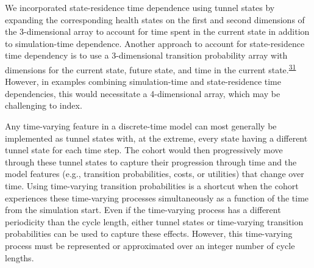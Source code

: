 \documentclass[
]{article}
\begin{document}
We incorporated state-residence time dependence using tunnel states by expanding the corresponding health states on the first and second dimensions of the 3-dimensional array to account for time spent in the current state in addition to simulation-time dependence. Another approach to account for state-residence time dependency is to use a 3-dimensional transition probability array with dimensions for the current state, future state, and time in the current state.\textsuperscript{\protect\hyperlink{ref-Hawkins2005}{31}} However, in examples combining simulation-time and state-residence time dependencies, this would necessitate a 4-dimensional array, which may be challenging to index.

Any time-varying feature in a discrete-time model can most generally be implemented as tunnel states with, at the extreme, every state having a different tunnel state for each time step. The cohort would then progressively move through these tunnel states to capture their progression through time and the model features (e.g., transition probabilities, costs, or utilities) that change over time. Using time-varying transition probabilities is a shortcut when the cohort experiences these time-varying processes simultaneously as a function of the time from the simulation start. Even if the time-varying process has a different periodicity than the cycle length, either tunnel states or time-varying transition probabilities can be used to capture these effects. However, this time-varying process must be represented or approximated over an integer number of cycle lengths.
\end{document}
